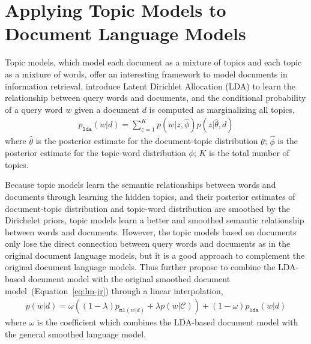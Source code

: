 
\section{Applying Topic Models to Document Language Models}

Topic models, which model each document as a mixture of topics and each topic as a mixture of words, offer an interesting framework to model documents in information retrieval. \cite{wei-06} introduce Latent Dirichlet Allocation (LDA) to learn the relationship between query words and documents, and the conditional probability of a query word $w$ given a document $d$ is computed as marginalizing all topics,
\begin{align}
p_{\texttt{lda}}(w|d) = \sum_{z=1}^K p(w|z, \hat{\phi}) p(z | \hat{\theta}, d)
\end{align}
where $\hat{\theta}$ is the posterior estimate for the document-topic distribution $\theta$; $\hat{\phi}$ is the posterior estimate for the topic-word distribution $\phi$; $K$ is the total number of topics.

Because topic models learn the semantic relationships between words and documents through learning the hidden topics, and their posterior estimates of document-topic distribution and topic-word distribution are smoothed by the Dirichelet priors, topic models learn a better and smoothed semantic relationship between words and documents. However, the topic models based on documents only lose the direct connection between query words and documents as in the original document language models, but it is a good approach to complement the original document language models. Thus \cite{wei-06} further propose to combine the LDA-based document model with the original smoothed document model~(Equation~\ref{eq:lm-jr}) through a linear interpolation,
\begin{align}
p(w|d) = \omega ((1 - \lambda) p_{\texttt{ml}(w|d)} + \lambda p(w|\mathcal{C})) + (1 - \omega) p_{\texttt{lda}}(w|d)
\end{align}
where $\omega$ is the coefficient which combines the LDA-based document model with the general smoothed language model.


